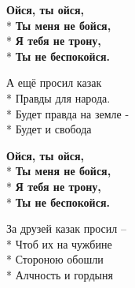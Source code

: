 \medskip

\begin{minipage}{\linewidth}
\hspace*{1.5em}\textbf{Ойся, ты ойся,}\\*
\hspace*{1.5em}\textbf{Ты меня не бойся,}\\*
\hspace*{1.5em}\textbf{Я тебя не трону,}\\*
\hspace*{1.5em}\textbf{Ты не беспокойся.}\\
\end{minipage}\par\medskip\nobreak

\medskip

\begin{minipage}{\linewidth}
А ещё просил казак\\*
Правды для народа.\\*
Будет правда на земле -\\*
Будет и свобода\\
\end{minipage}\par\medskip\nobreak

\medskip

\begin{minipage}{\linewidth}
\hspace*{1.5em}\textbf{Ойся, ты ойся,}\\*
\hspace*{1.5em}\textbf{Ты меня не бойся,}\\*
\hspace*{1.5em}\textbf{Я тебя не трону,}\\*
\hspace*{1.5em}\textbf{Ты не беспокойся.}\\
\end{minipage}\par\medskip\nobreak

\medskip

\begin{minipage}{\linewidth}
За друзей казак просил –\\*
Чтоб их на чужбине\\*
Стороною обошли\\*
Алчность и гордыня\\
\end{minipage}\par\medskip\nobreak

\medskip

